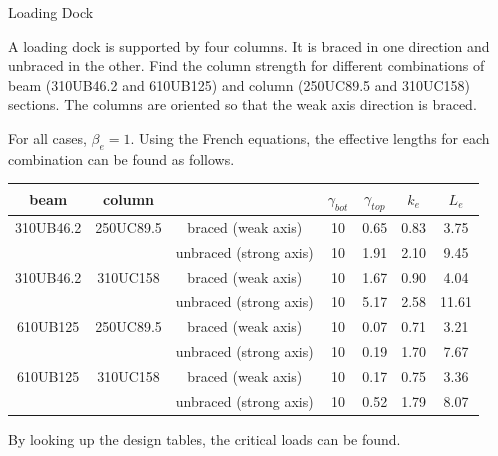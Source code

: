 \begin{exmp}Loading Dock

A loading dock is supported by four columns.
It is braced in one direction and unbraced in the other.
Find the column strength for different combinations of beam (310UB46.2 and 610UB125) and column (250UC89.5 and 310UC158) sections.
The columns are oriented so that the weak axis direction is braced.
\begin{figure}[H]

\end{figure}
\end{exmp}
\begin{solution}
For all cases, $\beta_e=1$.
Using the French equations, the effective lengths for each combination can be found as follows.
\begin{table}[H]
\centering\footnotesize
\renewcommand{\arraystretch}{1.2}
\begin{tabular}{ccccccc}
	\toprule
	  beam    &  column   &                        & $\gamma_{bot}$ & $\gamma_{top}$ & $k_e$ & $L_e$ \\ \midrule
	310UB46.2 & 250UC89.5 &   braced (weak axis)   &       10       &      0.65      & 0.83  & 3.75  \\
	          &           & unbraced (strong axis) &       10       &      1.91      & 2.10  & 9.45  \\
	310UB46.2 & 310UC158  &   braced (weak axis)   &       10       &      1.67      & 0.90  & 4.04  \\
	          &           & unbraced (strong axis) &       10       &      5.17      & 2.58  & 11.61 \\
	610UB125  & 250UC89.5 &   braced (weak axis)   &       10       &      0.07      & 0.71  & 3.21  \\
	          &           & unbraced (strong axis) &       10       &      0.19      & 1.70  & 7.67  \\
	610UB125  & 310UC158  &   braced (weak axis)   &       10       &      0.17      & 0.75  & 3.36  \\
	          &           & unbraced (strong axis) &       10       &      0.52      & 1.79  & 8.07  \\ \bottomrule
\end{tabular}
\end{table}
By looking up the design tables, the critical loads can be found.
\begin{table}[H]
\centering\footnotesize
\renewcommand{\arraystretch}{1.2}
\begin{tabular}{ccccccc}

\end{tabular}
\end{table}
\end{solution}
